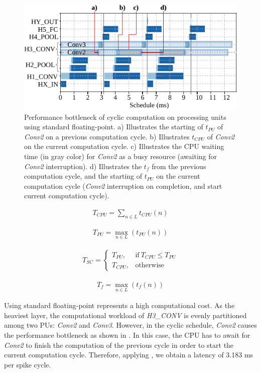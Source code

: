 \begin{figure}[h!]
	\centering
	\includegraphics[width=1\columnwidth]{../figures/latency_fp_cycle.pdf}
	\caption{Performance bottleneck of cyclic computation on processing units using standard floating-point. a) Illustrates the starting of $t_{PU}$ of \emph{Conv2} on a previous computation cycle. b) Illustrates $t_{CPU}$ of \emph{Conv2} on the current computation cycle. c) Illustrates the CPU waiting time (in gray color) for \emph{Conv2} as a busy resource (awaiting for \emph{Conv2} interruption). d) Illustrates the $t_{f}$ from the previous computation cycle, and the starting of $t_{PU}$ on the current computation cycle (\emph{Conv2} interruption on completion, and start current computation cycle).}
	\label{fig:latency_pu_fp_cycle}
\end{figure}

\begin{eqnarray} \label{eq:time_cpu}
T_{CPU} = \sum_{n\in L} t_{CPU}(n)
\end{eqnarray}

\begin{eqnarray} \label{eq:time_pu}
T_{PU} = \max_{n\in L}(t_{PU}(n))
\end{eqnarray}

\begin{eqnarray} \label{eq:time_spike}
T_{SC} =
\begin{cases}
T_{PU}, & \text{if}\ T_{CPU}\le T_{PU} \\
T_{CPU}, & \text{otherwise}
\end{cases}
\end{eqnarray}

\begin{eqnarray} \label{eq:time_finish}
T_{f} = \max_{n\in L}(t_{f}(n))
\end{eqnarray}

Using standard floating-point represents a high computational cost. As the heaviest layer, the computational workload of \emph{H3\_CONV} is evenly partitioned among two PUs: \emph{Conv2} and \emph{Conv3}. However, in the cyclic schedule, \emph{Conv2} causes the performance bottleneck as shown in . In this case, the CPU has to await for \emph{Conv2} to finish the computation of the previous cycle in order to start the current computation cycle. Therefore, applying , we obtain a latency of 3.183 ms per spike cycle.

